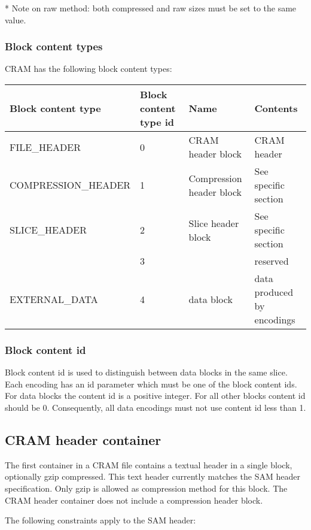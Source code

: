 \documentclass[a4paper]{article}
\begin{document}
* Note on raw method: both compressed and raw sizes must be set to the same value.

\subsubsection*{Block content types}
\label{subsec:block-content-types}

CRAM has the following block content types:

\begin{threeparttable}[t]
\begin{tabular}{|>{\raggedright}p{143pt}|>{\raggedright}p{45pt}|>{\raggedright}p{116pt}|>{\raggedright}p{114pt}|}
\hline
\textbf{Block content type} & \textbf{Block content type id} & \textbf{Name} & \textbf{Contents}\tabularnewline
\hline
FILE\_HEADER & 0 & CRAM header block & CRAM header\tabularnewline
\hline
COMPRESSION\_HEADER & 1 & Compression header block & See specific section\tabularnewline
\hline
SLICE\_HEADER & 2 & Slice header block & See specific section\tabularnewline
\hline
 & 3 &  & reserved\tabularnewline
\hline
EXTERNAL\_DATA & 4 & data block & data produced by encodings\tabularnewline
\hline
\end{tabular}
\end{threeparttable}

\subsubsection*{Block content id}

Block content id is used to distinguish between data blocks in the same slice. 
Each encoding has an id parameter which must be one of the block
content ids. For data blocks the content id is a positive integer. For all
other blocks content id should be 0. Consequently, all data encodings must 
not use content id less than 1. 

\subsection{CRAM header container}

The first container in a CRAM file contains a textual header in a single block, optionally
gzip compressed. This text header currently matches the SAM header specification. Only
gzip is allowed as compression method for this block. The CRAM header container does not
include a compression header block.

The following constraints apply to the SAM header: 
\end{document}
